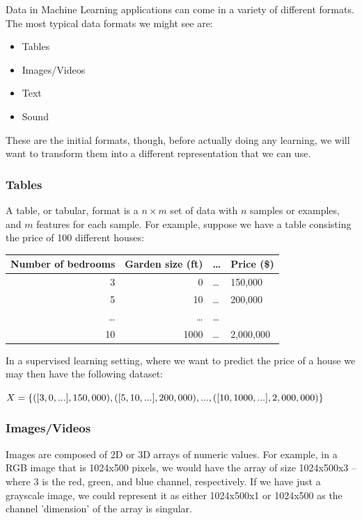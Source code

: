 \documentclass[10pt]{beamer}
\begin{document}
Data in Machine Learning applications can come in a variety of different formats. The
most typical data formats we might see are:

\begin{itemize}
\item Tables
\item Images/Videos
\item Text
\item Sound
\end{itemize}

These are the initial formats, though, before actually doing any learning, we will
want to transform them into a different representation that we can use.

\subsubsection*{Tables}
\label{sec:org8563f14}

A table, or tabular, format is a \(n \times m\) set of data with \(n\) samples or
examples, and \(m\) features for each sample. For example, suppose we have a table
consisting the price of 100 different houses:

\begin{center}
\begin{tabular}{rrll}
\toprule
Number of bedrooms & Garden size (ft) & \ldots{} & Price (\$)\\
\midrule
3 & 0 & \ldots{} & 150,000\\
5 & 10 & \ldots{} & 200,000\\
\ldots{} & \ldots{} & \ldots{} & \\
10 & 1000 & \ldots{} & 2,000,000\\
\bottomrule
\end{tabular}
\end{center}

In a supervised learning setting, where we want to predict the price of a house we may then have the following dataset:

\(X = \{([3, 0, ...], 150,000), ([5, 10, ...], 200,000), \\..., ([10, 1000, ...], 2,000,000)\}\)

\subsubsection*{Images/Videos}
\label{sec:orgf4fe593}

Images are composed of 2D or 3D arrays of numeric values. For example, in a RGB
image that is 1024x500 pixels, we would have the array of size 1024x500x3 -- where 3
is the red, green, and blue channel, respectively. If we have just a grayscale image,
we could represent it as either 1024x500x1 or 1024x500 as the channel 'dimension' of
the array is singular.
\end{document}
